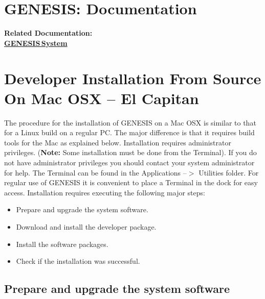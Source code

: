 \documentclass[12pt]{article}
\begin{document}
\section*{GENESIS: Documentation}

{\bf Related Documentation:} \\
\href{../genesis-system/genesis-system.tex}{\bf GENESIS\,System}


\section*{Developer Installation From Source On Mac OSX -- El Capitan}

The procedure for the installation of GENESIS on a Mac OSX is similar to that for a Linux build on a regular PC. The major difference is that it requires build tools for the Mac as explained below. Installation requires administrator privileges. ({\bf Note:} Some installation must be done from the Terminal). If you do not have administrator privileges you should contact your system administrator for help. The Terminal can be found in the Applications --$>$ Utilities folder. For regular use of GENESIS it is convenient to place a Terminal in the dock for easy access.
Installation requires executing the following major steps:
\begin{itemize}
   \item[] Prepare and upgrade the system software.
   \item[] Download and install the developer package.
   \item[] Install the software packages.
   \item[] Check if the installation was successful. 
\end{itemize}

\subsection*{Prepare and upgrade the system software}
\end{document}
